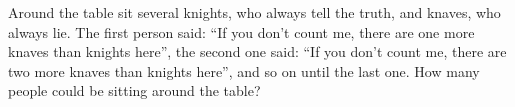 \problem
Around the table sit several knights, who always tell the truth, and knaves,
who always lie.
The first person said:
``If you don't count me, there are one more knaves than knights here'',
the second one said:
``If you don't count me, there are two more knaves than knights here'',
and so on until the last one.
How many people could be sitting around the table?
\solution
\endproblem
